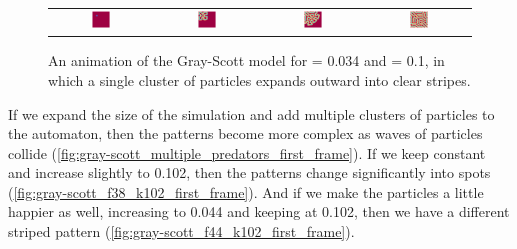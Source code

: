 \begin{figure}[h]
\centering
\mySfFamily
\begin{tabular}{c c c c}
\includegraphics[width = 0.19\textwidth]{../images/gs_f038_k100_Moment_1} & \includegraphics[width = 0.19\textwidth]{../images/gs_f038_k100_Moment_2} & \includegraphics[width = 0.19\textwidth]{../images/gs_f038_k100_Moment_3} & \includegraphics[width = 0.19\textwidth]{../images/gs_f038_k100_Moment_4}
\end{tabular}
\caption{An animation of the Gray-Scott model for  = 0.034 and  = 0.1, in which a single cluster of  particles expands outward into clear stripes.}
\label{fig:gray-scott_movie_first_frame}
\end{figure}

If we expand the size of the simulation and add multiple clusters of  particles to the automaton, then the patterns become more complex as waves of  particles collide (\autoref{fig:gray-scott_multiple_predators_first_frame}). If we keep  constant and increase  slightly to 0.102, then the patterns change significantly into spots (\autoref{fig:gray-scott_f38_k102_first_frame}). And if we make the  particles a little happier as well, increasing   to 0.044 and keeping  at 0.102, then we have a different striped pattern (\autoref{fig:gray-scott_f44_k102_first_frame}).\\

